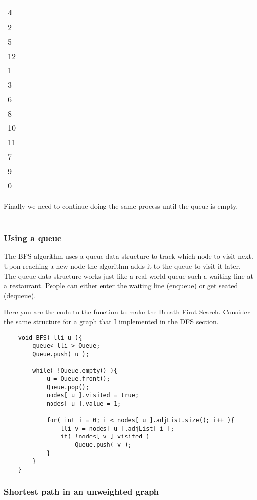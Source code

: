 \begin{table}[H]
    \centering
    \begin{tabular}{|l|}
    \hline
    4                         \\ \hline
    2                         \\ \hline
    5                         \\ \hline
    12                        \\ \hline
    1                         \\ \hline
    \rowcolor[HTML]{EFEFEF} 
    3                         \\ \hline
    \rowcolor[HTML]{EFEFEF} 
    6                         \\ \hline
    \rowcolor[HTML]{EFEFEF} 
    8                         \\ \hline
    \rowcolor[HTML]{EFEFEF} 
    10                        \\ \hline
    \rowcolor[HTML]{EFEFEF} 
    {\color[HTML]{333333} 11} \\ \hline
    \rowcolor[HTML]{EFEFEF} 
    7                         \\ \hline
    \rowcolor[HTML]{EFEFEF} 
    9                         \\ \hline
    \rowcolor[HTML]{EFEFEF} 
    0                         \\ \hline
    \end{tabular}
\end{table}

Finally we need to continue doing the same process until the queue is empty.\\\\

\subsubsection{Using a queue}
The BFS algorithm uses a queue data structure to track which node to visit next. Upon reaching a new node the algorithm adds it to the queue to visit it later. The queue data structure works just like a real world queue such a waiting line at a restaurant. People can either enter the waiting line (enqueue) or get seated (dequeue).

Here you are the code to the function to make the Breath First Search. Consider the same structure for a graph that I implemented in the DFS section.

\begin{lstlisting}
    void BFS( lli u ){
        queue< lli > Queue;
        Queue.push( u );

        while( !Queue.empty() ){
            u = Queue.front();
            Queue.pop();
            nodes[ u ].visited = true;
            nodes[ u ].value = 1;

            for( int i = 0; i < nodes[ u ].adjList.size(); i++ ){
                lli v = nodes[ u ].adjList[ i ];
                if( !nodes[ v ].visited )
                    Queue.push( v );
            }
        }
    }
\end{lstlisting}

\subsubsection{Shortest path in an unweighted graph}

